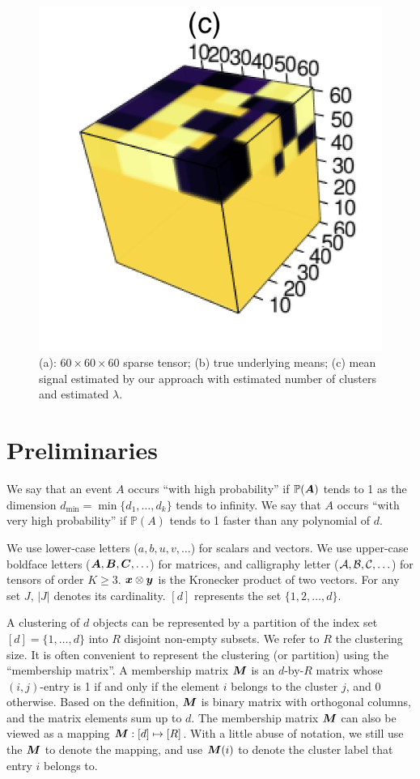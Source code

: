 \documentclass{article}
\begin{document}
\begin{figure}
	\includegraphics[scale=0.5]{figures/figure2/output.png}
	\caption{(a): $60\times 60\times 60$ sparse tensor; (b) true underlying means; (c) mean signal estimated by our approach with estimated number of clusters and estimated $\lambda$.}
	\label{fig:2}
\end{figure}


\section{Preliminaries}

We say that an event $A$ occurs ``with high probability'' if $\mathbb{P}(\bm A)$ tends to 1 as the dimension $d_{\min}=\min\{d_1,\ldots,d_k\}$ tends to infinity. We say that $A$ occurs ``with very high probability'' if $\mathbb{P}(A)$ tends to 1 faster than any polynomial of $d$. 


We use lower-case letters ($a,b,u,v,\ldots$) for scalars and vectors. We use upper-case boldface letters ($\bm A,\bm B,\bm C,\ldots$) for matrices, and calligraphy letter ($\mathcal{A}, \mathcal{B}, \mathcal{C},\ldots$) for tensors of order $K\geq 3$. $\bm x\otimes \bm{y}$ is the Kronecker product of two vectors. For any set $J$, $|J|$ denotes its cardinality. $[d]$ represents the set $\{1,2,\ldots,d\}$. 

A clustering of $d$ objects can be represented by a partition of the index set $[d]=\{1,\ldots,d\}$ into $R$ disjoint non-empty subsets. We refer to $R$ the clustering size. It is often convenient to represent the clustering (or partition) using the ``membership matrix''. A membership matrix $\bm M$ is an $d$-by-$R$ matrix whose $(i,j)$-entry is 1 if and only if the element $i$ belongs to the cluster $j$, and 0 otherwise. Based on the definition, $\bm M$ is binary matrix with orthogonal columns, and the matrix elements sum up to $d$. The membership matrix $\bm M$ can also be viewed as a mapping $\bm M:[d]\mapsto[R]$. With a little abuse of notation, we still use the $\bm M$ to denote the mapping, and use $\bm M(i)$ to denote the cluster label that entry $i$ belongs to. 
\end{document}
